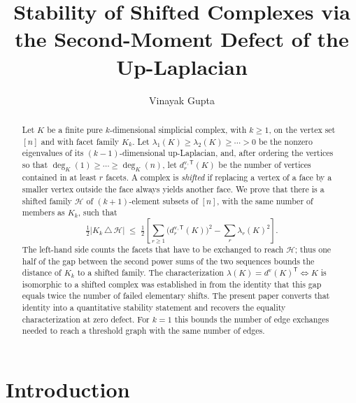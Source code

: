 \documentclass[11pt,reqno]{amsart}
\theoremstyle{plain}
\theoremstyle{definition}
\newcommand{\dv}{d^{\mathrm{v}}}
\newcommand{\dvT}[1]{d^{\mathrm{v},\mathsf{T}}_{#1}}
\newcommand{\HH}{\mathcal{H}}
\begin{document}
\title[Stability of shifted complexes]{Stability of Shifted Complexes via the
Second-Moment Defect of the Up-Laplacian}

\author{Vinayak Gupta}
\address{Department of Mathematics, Indian Institute of Technology Guwahati,
Guwahati 781039, India}


\begin{abstract}

Let $K$ be a finite pure $k$-dimensional simplicial complex, with $k\ge1$, on the vertex set $[n]$
and with facet family $K_k$. Let $\lambda_1(K)\ge\lambda_2(K)\ge\cdots>0$ be the nonzero
eigenvalues of its
$(k-1)$-dimensional up-Laplacian, and, after ordering the vertices so that
$\deg_K(1)\ge\cdots\ge\deg_K(n)$, let $\dvT{r}(K)$ be the number of vertices contained in at least
$r$ facets. A complex is \emph{shifted} if replacing a vertex of a face by a smaller vertex outside
the face always yields another face. We prove that there is a shifted family $\HH$ of
$(k+1)$-element subsets of $[n]$, with the same number of members as $K_k$, such that
\[
\tfrac12\bigl|K_k\,\triangle\,\HH\bigr|
\;\le\;
\tfrac12\left[\sum_{r\ge1}\bigl(\dvT{r}(K)\bigr)^{2}-\sum_{r}\lambda_r(K)^{2}\right].
\]
The left-hand side counts the facets that have to be exchanged to reach $\HH$; thus one half of the
gap between the second power sums of the two sequences bounds the distance of $K_k$ to a shifted
family. The characterization
$\lambda(K)=\dv(K)^{\mathsf T}\iff K$ is isomorphic to a shifted complex was established in
\cite{Gupta} from the identity that this gap equals twice the number of failed elementary shifts.
The present paper converts that identity into a quantitative stability statement and recovers the
equality characterization at zero defect. For $k=1$ this bounds the number of edge exchanges needed
to reach a threshold graph with the same number of edges.
\end{abstract}


\maketitle 

\section{Introduction}
\end{document}
